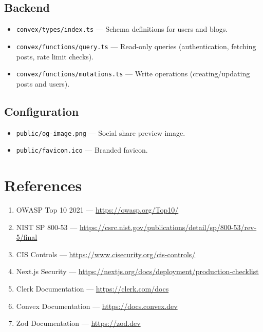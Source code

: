 \documentclass[11pt,a4paper]{article}
\begin{document}
\subsection{Backend}
\begin{itemize}
    \item \texttt{convex/types/index.ts} — Schema definitions for users and blogs.
    \item \texttt{convex/functions/query.ts} — Read-only queries (authentication, fetching posts, rate limit checks).
    \item \texttt{convex/functions/mutations.ts} — Write operations (creating/updating posts and users).
\end{itemize}

\subsection{Configuration}
\begin{itemize}
    \item \texttt{public/og-image.png} — Social share preview image.
    \item \texttt{public/favicon.ico} — Branded favicon.
\end{itemize}

\section{References}
\begin{enumerate}
    \item OWASP Top 10 2021 — \url{https://owasp.org/Top10/}
    \item NIST SP 800-53 — \url{https://csrc.nist.gov/publications/detail/sp/800-53/rev-5/final}
    \item CIS Controls — \url{https://www.cisecurity.org/cis-controls/}
    \item Next.js Security — \url{https://nextjs.org/docs/deployment/production-checklist}
    \item Clerk Documentation — \url{https://clerk.com/docs}
    \item Convex Documentation — \url{https://docs.convex.dev}
    \item Zod Documentation — \url{https://zod.dev}
\end{enumerate}
\end{document}
